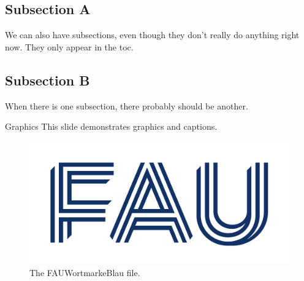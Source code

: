 \subsection{Subsection A}
\begin{frame}{\mbox{}}
We can also have subsections, even though they don't really do anything right now. They only appear in the toc. 
\end{frame}
%
%
%
%
%
\subsection{Subsection B}
\begin{frame}{\mbox{}}
When there is one subsection, there probably should be another.
\end{frame}
%
%
\begin{frame}{Graphics}
This slide demonstrates graphics and captions.
\begin{figure}
\includegraphics[width=.7\textwidth]{template-art/FAUWortmarkeBlau.pdf}
\caption{The FAUWortmarkeBlau file.}
\end{figure}
\end{frame}
%
%
%
%
%
